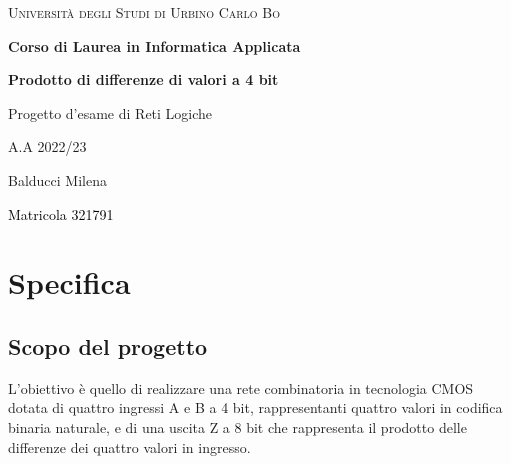 \documentclass[10pt]{article}
\begin{document}
\begin{titlepage}
  \begin{center}
  {{\Large{\textsc{Università degli Studi di Urbino Carlo Bo}}}} 
  \\\vspace{2mm}
  
  {\normalsize{\bf Corso di Laurea in Informatica Applicata}}
  \end{center}
  
      \vspace{40mm}
      \begin{center}
      {\Large\bf{Prodotto di differenze di valori a 4 bit}} 
      \end{center}
      
      \vspace{10mm}
      
      \begin{center}
      {\Large{Progetto d'esame di Reti Logiche 
      \vspace{3mm}}}
      \end{center}
      
      \vspace{10mm}
      
      \begin{center}
      {\Large A.A 2022/23 
      \vspace{3mm}}
      \end{center}
      
      \vspace{80mm} \par \noindent
      
  \begin{minipage}[t]{0.35\textwidth}
  {\large Balducci Milena}
  \end{minipage}
  \hfill
  \begin{minipage}[t]{0.35\textwidth}\raggedleft \textcolor{black}{
  {\large Matricola 321791}}
  \end{minipage}
  \end{titlepage}

\newpage

\section{Specifica}

\subsection{Scopo del progetto}
L'obiettivo è quello di realizzare una rete combinatoria in tecnologia CMOS dotata di quattro ingressi A e B a 4 bit, rappresentanti quattro valori in codifica binaria naturale, 
e di una uscita Z a 8 bit che rappresenta il prodotto delle differenze dei quattro valori in ingresso.
\end{document}
